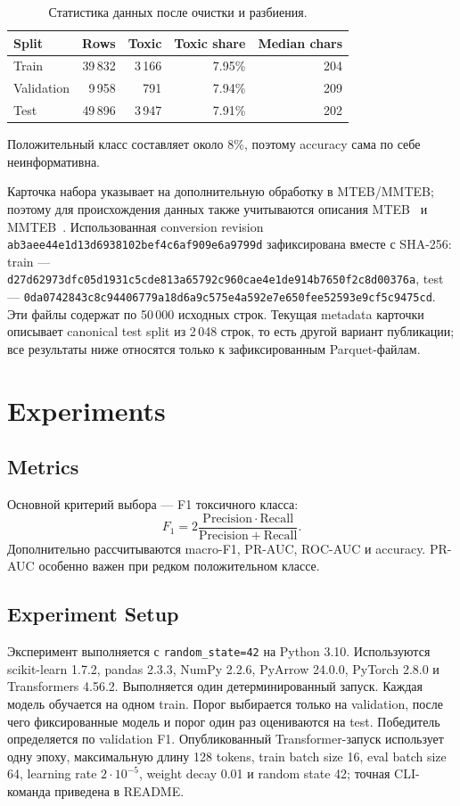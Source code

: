 \documentclass{article}
\begin{document}
\begin{table}[tbh!]
\centering
\begin{tabular}{|l|r|r|r|r|}
\hline
Split & Rows & Toxic & Toxic share & Median chars\\
\hline
Train & 39\,832 & 3\,166 & 7.95\% & 204\\
Validation & 9\,958 & 791 & 7.94\% & 209\\
Test & 49\,896 & 3\,947 & 7.91\% & 202\\
\hline
\end{tabular}
\caption{Статистика данных после очистки и разбиения.}
\label{tab:dataset}
\end{table}

Положительный класс составляет около 8\%, поэтому accuracy сама по себе
неинформативна.

Карточка набора указывает на дополнительную обработку в MTEB/MMTEB; поэтому для
происхождения данных также учитываются описания MTEB~\cite{muennighoff2023mteb}
и MMTEB~\cite{enevoldsen2025mmteb}. Использованная conversion revision
\nolinkurl{ab3aee44e1d13d6938102bef4c6af909e6a9799d} зафиксирована вместе с
SHA-256: train ---
\nolinkurl{d27d62973dfc05d1931c5cde813a65792c960cae4e1de914b7650f2c8d00376a},
test ---
\nolinkurl{0da0742843c8c94406779a18d6a9c575e4a592e7e650fee52593e9cf5c9475cd}.
Эти файлы содержат по 50\,000 исходных строк. Текущая metadata карточки описывает
canonical test split из 2\,048 строк, то есть другой вариант публикации; все
результаты ниже относятся только к зафиксированным Parquet-файлам.

\section{Experiments}
\subsection{Metrics}
Основной критерий выбора --- F1 токсичного класса:
\[
F_1 = 2\frac{\mathrm{Precision}\cdot\mathrm{Recall}}
{\mathrm{Precision}+\mathrm{Recall}}.
\]
Дополнительно рассчитываются macro-F1, PR-AUC, ROC-AUC и accuracy. PR-AUC
особенно важен при редком положительном классе.

\subsection{Experiment Setup}
Эксперимент выполняется с \texttt{random\_state=42} на Python 3.10.
Используются scikit-learn 1.7.2, pandas 2.3.3, NumPy 2.2.6, PyArrow 24.0.0,
PyTorch 2.8.0 и Transformers 4.56.2.
Выполняется один детерминированный запуск. Каждая модель обучается на одном
train. Порог выбирается только на validation, после чего фиксированные модель и
порог один раз оцениваются на test. Победитель определяется по validation F1.
Опубликованный Transformer-запуск использует одну эпоху, максимальную длину
128 tokens, train batch size 16, eval batch size 64, learning rate $2\cdot10^{-5}$,
weight decay 0.01 и random state 42; точная CLI-команда приведена в README.
\end{document}
